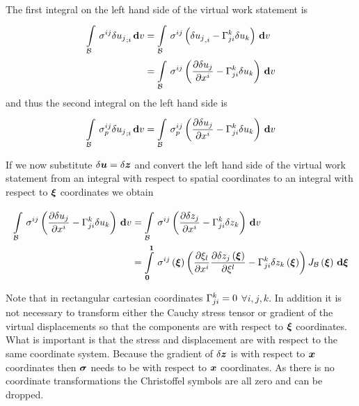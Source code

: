 The first integral on the left hand side of the virtual work statement is
\begin{equation}
  \begin{split}
      \displaystyle\int\limits_{ \mathcal{B} }^{} \,\sigma^{ij} {\delta u_{j}}_{;i} \, \boldsymbol{\mathrm{d}}  v 
    &=   \displaystyle\int\limits_{ \mathcal{B} }^{} \,\sigma^{ij}\left(  {\delta
          u_{j}}_{,i} - \Gamma^{k}_{ji} \delta u_{k} \right)\, \boldsymbol{\mathrm{d}}  v  \\
    &=   \displaystyle\int\limits_{ \mathcal{B} }^{} \,\sigma^{ij}\left(  \dfrac{\partial \delta
          u_{j}}{\partial x^{i}} - \Gamma^{k}_{ji} \delta u_{k} \right)\, \boldsymbol{\mathrm{d}}  v 
  \end{split}
\end{equation}
and thus the second integral on the left hand side is
\begin{equation}
    \displaystyle\int\limits_{ \mathcal{B} }^{} \,\sigma^{ij}_{p} {\delta u_{j}}_{;i} \, \boldsymbol{\mathrm{d}}  v =
    \displaystyle\int\limits_{ \mathcal{B} }^{} \,\sigma^{ij}_{p}\left(  \dfrac{\partial \delta
        u_{j}}{\partial x^{i}} - \Gamma^{k}_{ji} \delta u_{k} \right)\, \boldsymbol{\mathrm{d}}  v 
\end{equation}

If we now substitute $\delta\boldsymbol{u}=\delta\boldsymbol{z}$ and convert the left
hand side of the virtual work statement from an integral with respect to
spatial coordinates to an integral with respect to $\boldsymbol{\xi}$ coordinates we obtain

\begin{equation}
  \begin{split}
    \gint{\embedmanifold{B}}{}{\sigma^{ij}\pbrac{\delby{\delta
          u_{j}}{x^{i}}-\christoffel{k}{j}{i}\delta u_{k}}}{v}
    &= \gint{\embedmanifold{B}}{}{\sigma^{ij}\pbrac{\delby{\delta
          z_{j}}{x^{i}}-\christoffel{k}{j}{i}\delta z_{k}}}{v} \\
    &= \gint{\vectr{0}}{\vectr{1}}{\fnof{\sigma^{ij}}{\vectr{\xi}}\pbrac{\delby{\xi_{l}}{x^{i}}\delby{\delta
          \fnof{z_{j}}{\vectr{\xi}}}{\xi^{l}}-\christoffel{k}{j}{i}\delta\fnof{z_{k}}{\vect{\xi}}}\fnof{J_{\embedmanifold{B}}}{\vectr{\xi}}}{\vectr{\xi}}
  \end{split}
\end{equation}

Note that in rectangular cartesian coordinates $ \Gamma^{k}_{ji} =0$ 
$\forall i,j,k$. In addition it is not necessary to transform either the
Cauchy stress tensor or gradient of the virtual displacements so that the
components are with respect to $\boldsymbol{\xi}$ coordinates. What is important is that
the stress and displacement are with respect to the same coordinate
system. Because the gradient of $\delta \boldsymbol{z}$ is with respect to $\boldsymbol{x}$ coordinates
then $\boldsymbol{\mathit{\sigma}}$ needs to be with respect to $\boldsymbol{x}$ coordinates. As there
is no coordinate transformations the Christoffel symbols are all zero and can
be dropped.

